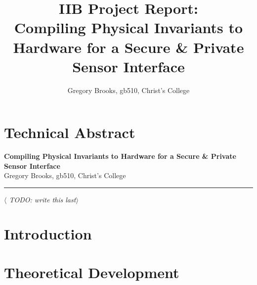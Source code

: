 \documentclass[12pt]{article}
\begin{document}

\clearpage \mbox{}
\clearpage
{}

\noindent

%
%

\title
{
  IIB Project Report:\\
  Compiling Physical Invariants to Hardware for a Secure \& Private Sensor Interface\\
}
\author{Gregory Brooks, gb510, Christ's College}
\date{}
\maketitle

\tableofcontents

\clearpage
{}

%
%

\section{Technical Abstract}

\begin{center}
{
  \bf Compiling Physical Invariants to Hardware for a Secure \& Private Sensor Interface\\
}
Gregory Brooks, gb510, Christ's College
\end{center}
\rule{15.7cm}{0.5mm}
\vspace{1cm}


\textit{$\langle$ TODO: write this last$\rangle$}

\newpage



%
%

\section{Introduction}

\newpage



%
%

\section{Theoretical Development}

\newpage



%
%
\end{document}
